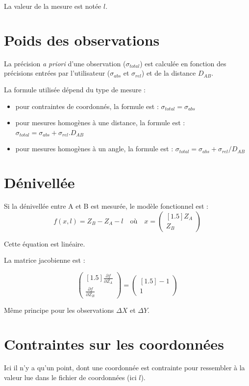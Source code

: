 \documentclass[french]{report}
\begin{document}
La valeur de la mesure est notée $l$.


\section{Poids des observations}

La précision \textit{a priori} d'une observation ($\sigma_{total}$) est calculée en fonction
des précisions entrées par l'utilisateur ($\sigma_{abs}$ et $\sigma_{rel}$) et de la distance $D_{AB}$.

La formule utilisée dépend du type de mesure :
\begin{itemize}
 \item pour contraintes de coordonnés, la formule est : $\sigma_{total} = \sigma_{abs}$
 \item pour mesures homogènes à une distance, la formule est : $\sigma_{total} = \sigma_{abs} + \sigma_{rel} . D_{AB}$
 \item pour mesures homogènes à un angle, la formule est : $\sigma_{total} = \sigma_{abs} + \sigma_{rel} / D_{AB}$ 
\end{itemize}

\section{Dénivellée}
Si la dénivellée entre A et B est mesurée, le modèle fonctionnel est :
$$f(x,l) = Z_B - Z_A - l \quad \text{où} \quad x=
\begin{pmatrix}[1.5] Z_A\\ Z_B \end{pmatrix}$$

Cette équation est linéaire.

La matrice jacobienne est :

$$\begin{pmatrix}[1.5] \frac{\partial f}{\partial Z_A}\\ \frac{\partial f}{\partial Z_B} \end{pmatrix}
=\begin{pmatrix}[1.5] -1\\ 1 \end{pmatrix}$$

Même principe pour les observations $\Delta X$ et  $\Delta Y$.

\section{Contraintes sur les coordonnées}
Ici il n'y a qu'un point, dont une coordonnée est contrainte pour ressembler à la valeur lue dans le fichier de coordonnées (ici $l$).
\end{document}
